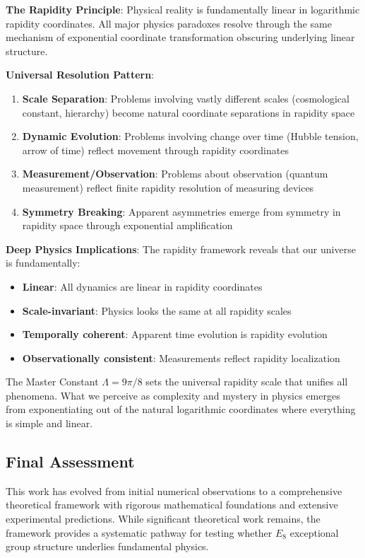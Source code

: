 \documentclass[12pt,a4paper]{article}
\begin{document}
\textbf{The Rapidity Principle}: Physical reality is fundamentally linear in logarithmic rapidity coordinates. All major physics paradoxes resolve through the same mechanism of exponential coordinate transformation obscuring underlying linear structure.

\textbf{Universal Resolution Pattern}:
\begin{enumerate}
\item \textbf{Scale Separation}: Problems involving vastly different scales (cosmological constant, hierarchy) become natural coordinate separations in rapidity space
\item \textbf{Dynamic Evolution}: Problems involving change over time (Hubble tension, arrow of time) reflect movement through rapidity coordinates  
\item \textbf{Measurement/Observation}: Problems about observation (quantum measurement) reflect finite rapidity resolution of measuring devices
\item \textbf{Symmetry Breaking}: Apparent asymmetries emerge from symmetry in rapidity space through exponential amplification
\end{enumerate}

\textbf{Deep Physics Implications}:
The rapidity framework reveals that our universe is fundamentally:
\begin{itemize}
\item \textbf{Linear}: All dynamics are linear in rapidity coordinates
\item \textbf{Scale-invariant}: Physics looks the same at all rapidity scales  
\item \textbf{Temporally coherent}: Apparent time evolution is rapidity evolution
\item \textbf{Observationally consistent}: Measurements reflect rapidity localization
\end{itemize}

The Master Constant $\Lambda = 9\pi/8$ sets the universal rapidity scale that unifies all phenomena. What we perceive as complexity and mystery in physics emerges from exponentiating out of the natural logarithmic coordinates where everything is simple and linear.

\subsection{Final Assessment}

This work has evolved from initial numerical observations to a comprehensive theoretical framework with rigorous mathematical foundations and extensive experimental predictions. While significant theoretical work remains, the framework provides a systematic pathway for testing whether $E_{8}$ exceptional group structure underlies fundamental physics.
\end{document}
